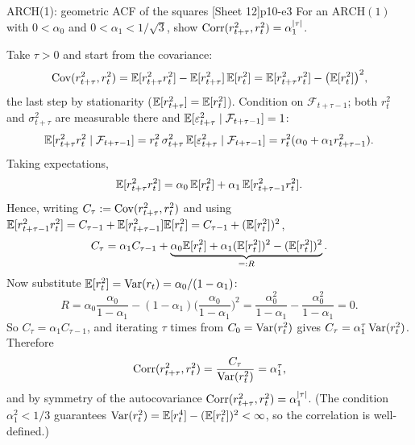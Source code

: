 \begin{exercise}{ARCH(1): geometric ACF of the squares \quad\textnormal{[Sheet 12]}}{p10-e3}
For an $\mathrm{ARCH}(1)$ with $0<\alpha_0$ and $0<\alpha_1<1/\sqrt3$, show
$\operatorname{Corr}(r_{t+\tau}^2,r_t^2)=\alpha_1^{\left\lvert \tau \right\rvert}$.
\end{exercise}
\begin{solution}
Take $\tau>0$ and start from the covariance:
\[
\operatorname{Cov}(r_{t+\tau}^2,r_t^2)=\mathbb{E}[r_{t+\tau}^2 r_t^2]-\mathbb{E}[r_{t+\tau}^2]\,\mathbb{E}[r_t^2]
=\mathbb{E}[r_{t+\tau}^2 r_t^2]-\big(\mathbb{E}[r_t^2]\big)^2,
\]
the last step by stationarity ($\mathbb{E}[r_{t+\tau}^2]=\mathbb{E}[r_t^2]$). Condition on
$\mathcal F_{t+\tau-1}$; both $r_t^2$ and $\sigma_{t+\tau}^2$ are measurable there
and $\mathbb{E}[\varepsilon_{t+\tau}^2\mid\mathcal F_{t+\tau-1}]=1$:
\[
\mathbb{E}[r_{t+\tau}^2 r_t^2\mid\mathcal F_{t+\tau-1}]
=r_t^2\,\sigma_{t+\tau}^2\,\mathbb{E}[\varepsilon_{t+\tau}^2\mid\mathcal F_{t+\tau-1}]
=r_t^2(\alpha_0+\alpha_1 r_{t+\tau-1}^2).
\]
Taking expectations,
\[
\mathbb{E}[r_{t+\tau}^2 r_t^2]
=\alpha_0\,\mathbb{E}[r_t^2]+\alpha_1\,\mathbb{E}[r_{t+\tau-1}^2 r_t^2].
\]
Hence, writing $C_\tau:=\operatorname{Cov}(r_{t+\tau}^2,r_t^2)$ and using
$\mathbb{E}[r_{t+\tau-1}^2 r_t^2]=C_{\tau-1}+\mathbb{E}[r_{t+\tau-1}^2]\mathbb{E}[r_t^2]
=C_{\tau-1}+(\mathbb{E}[r_t^2])^2$,
\[
C_\tau=\alpha_1 C_{\tau-1}
+\underbrace{\alpha_0\mathbb{E}[r_t^2]+\alpha_1(\mathbb{E}[r_t^2])^2-(\mathbb{E}[r_t^2])^2}_{=:R}.
\]
Now substitute $\mathbb{E}[r_t^2]=\operatorname{Var}(r_t)=\alpha_0/(1-\alpha_1)$:
\[
R=\alpha_0\frac{\alpha_0}{1-\alpha_1}-(1-\alpha_1)\Big(\frac{\alpha_0}{1-\alpha_1}\Big)^2
=\frac{\alpha_0^2}{1-\alpha_1}-\frac{\alpha_0^2}{1-\alpha_1}=0 .
\]
So $C_\tau=\alpha_1 C_{\tau-1}$, and iterating $\tau$ times from
$C_0=\operatorname{Var}(r_t^2)$ gives $C_\tau=\alpha_1^{\tau}\operatorname{Var}(r_t^2)$. Therefore
\[
\operatorname{Corr}(r_{t+\tau}^2,r_t^2)=\frac{C_\tau}{\operatorname{Var}(r_t^2)}=\alpha_1^{\tau},
\]
and by symmetry of the autocovariance $\operatorname{Corr}(r_{t+\tau}^2,r_t^2)=\alpha_1^{\left\lvert \tau \right\rvert}$.
(The condition $\alpha_1^2<1/3$ guarantees $\operatorname{Var}(r_t^2)=\mathbb{E}[r_t^4]-(\mathbb{E}[r_t^2])^2<\infty$,
so the correlation is well-defined.)
\end{solution}

